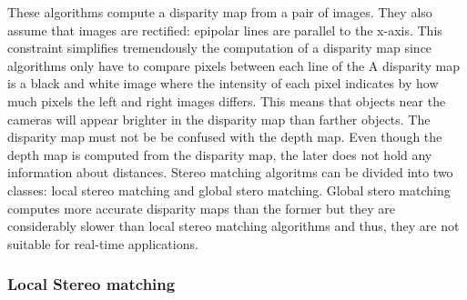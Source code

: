 \documentclass[12pt]{article}
\begin{document}
These algorithms compute a disparity map from a pair of images. They also assume that images are rectified: epipolar lines are parallel to the x-axis. This constraint simplifies tremendously the computation of a disparity map since algorithms only have to compare pixels between each line of the  A disparity map is a black and white image where the intensity of each pixel indicates by how much pixels the left and right images differs. This means that objects near the cameras will appear brighter in the disparity map than farther objects. The disparity map must not be be confused with the depth map. Even though the depth map is computed from the disparity map, the later does not hold any information about distances.
Stereo matching algoritms can be divided into two classes: local stereo matching and global stero matching. Global stero matching computes more accurate disparity maps than the former but they are considerably slower than local stereo matching algorithms and thus, they are not suitable for real-time applications.

\subsubsection{Local Stereo matching}
\end{document}
